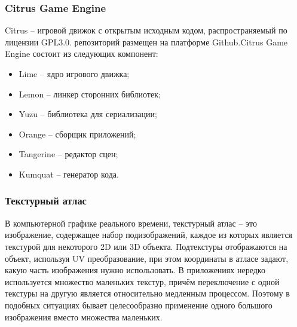 \documentclass{fefu_thesis/cls/fefu}
\begin{document}
    \subsubsection{Citrus Game Engine}
    Citrus – игровой движок с открытым исходным кодом, распространяемый по лицензии GPL­3.0. репозиторий размещен на платформе Github\cite{CitrusRepo}.Citrus Game Engine состоит из следующих компонент:
    \begin{itemize}
        \item Lime -- ядро игрового движка;
        \item Lemon -- линкер сторонних библиотек;
        \item Yuzu -- библиотека для сериализации;
        \item Orange -- сборщик приложений;
        \item Tangerine -- редактор сцен;
        \item Kumquat -- генератор кода.
    \end{itemize}
    \subsubsection{Текстурный атлас}
    В компьютерной графике реального времени, текстурный атлас – это изображение, содержащее набор под­изображений, каждое из которых является текстурой для некоторого 2D или 3D объекта. Под­текстуры отображаются на объект, используя UV ­преобразование, при этом координаты в атласе задают, какую часть изображения нужно использовать. В приложениях нередко используется множество маленьких текстур, причём переключение с одной текстуры на другую является относительно медленным процессом. Поэтому в подобных ситуациях бывает целесообразно применение одного большого изображения вместо множества маленьких.
\end{document}
